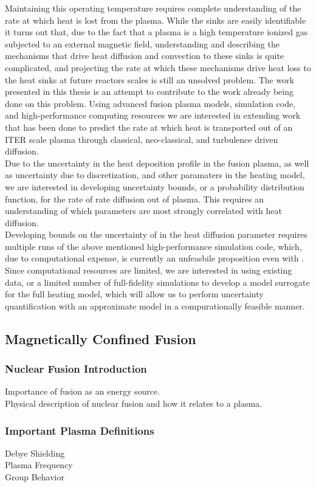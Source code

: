 \documentclass{article}
\begin{document}
Maintaining this operating temperature requires complete understanding of the rate at which heat is lost from the plasma. While the sinks are easily identifiable it turns out that, due to the fact that a plasma is a high temperature ionized gas subjected to an external magnetic field, understanding and describing the mechanisms that drive heat diffusion and convection to these sinks is quite complicated, and projecting the rate at which these mechanisms drive heat loss to the heat sinks at future reactors scales is still an unsolved problem. The work presented in this thesis is an attempt to contribute to the work already being done on this problem. Using advanced fusion plasma models, simulation code, and high-performance computing resources we are interested in extending work that has been done to predict the rate at which heat is transported out of an ITER scale plasma through classical, neo-classical, and turbulence driven diffusion.\\
Due to the uncertainty in the heat deposition profile in the fusion plasma, as well as uncertainty due to discretization, and other paramaters in the heating model, we are interested in developing uncertainty bounds, or a probability distribution function, for the rate of rate diffusion out of plasma. This requires an understanding of which parameters are most strongly correlated with heat diffusion.\\
Developing bounds on the uncertainty of in the heat diffusion parameter requires multiple runs of the above mentioned high-performance simulation code, which, due to computational expense, is currently an unfeasbile proposition even with . Since computational resources are limited, we are interested in using existing data, or a limited number of full-fidelity simulations to develop a model surrogate for the full heating model, which will allow us to perform uncertainty quantification with an approximate model in a compurationally feasible manner.


\subsection{Magnetically Confined Fusion}
\subsubsection{Nuclear Fusion Introduction}
Importance of fusion as an energy source.\\
Physical description of nuclear fusion and how it relates to a plasma.
\subsubsection{Important Plasma Definitions}
Debye Shielding\\
Plasma Frequency\\
Group Behavior\\
\end{document}
